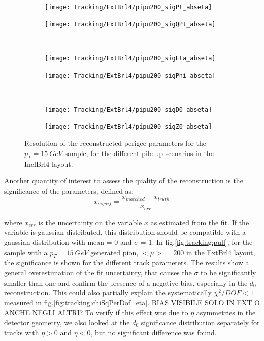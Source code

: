 \documentclass[a4paper,twoside,12pt]{article}
\begin{document}
\begin{figure}
\begin{subfigure}{.5\linewidth}
\texttt{[image: Tracking/ExtBrl4/pipu200\_sigPt\_abseta]}
\caption{}
\label{fig:tracking:pi15_sigPt_abseta_InclBrl4}
\end{subfigure}
\begin{subfigure}{.5\linewidth}
\texttt{[image: Tracking/ExtBrl4/pipu200\_sigQPt\_abseta]}
\caption{}
\label{fig:tracking:pi15_sigQPt_abseta_InclBrl4}
\end{subfigure}\\[1ex]
\begin{subfigure}{.5\linewidth}
\texttt{[image: Tracking/ExtBrl4/pipu200\_sigEta\_abseta]}
\caption{}
\label{fig:tracking:pi15_sigEta_abseta_InclBrl4}
\end{subfigure}
\begin{subfigure}{.5\linewidth}
\texttt{[image: Tracking/ExtBrl4/pipu200\_sigPhi\_abseta]}
\caption{}
\label{fig:tracking:pi15_sigPhi_abseta_InclBrl4}
\end{subfigure}\\[1ex]
\begin{subfigure}{.5\linewidth}
\texttt{[image: Tracking/ExtBrl4/pipu200\_sigD0\_abseta]}
\caption{}
\label{fig:tracking:pi15_sigD0_abseta_InclBrl4}
\end{subfigure}
\begin{subfigure}{.5\linewidth}
\texttt{[image: Tracking/ExtBrl4/pipu200\_sigZ0\_abseta]}
\caption{}
\label{fig:tracking:pi15_sigZ0_abseta_InclBrl4}
\end{subfigure}
\caption{Resolution of the reconstructed perigee parameters for the $p_{T} = 15\ GeV$ sample, for the different pile-up scenarios in the InclBrl4 layout.}
\label{fig:tracking:resolutionPileup_InclBrl4}
\end{figure}

Another quantity of interest to assess the quality of the reconstruction is the significance of the parameters, defined as:
$$
x_{signif} = \frac{x_{matched} - x_{truth}}{x_{err}}
$$

where $x_{err}$ is the uncertainty on the variable $x$ as estimated from the fit. If the variable is gaussian distributed, this distribution should be compatible with
a gaussian distribution with mean = 0 and $\sigma$ = 1. In fig.\ref{fig:tracking:pull}, for the sample with a $p_{T} = 15\ GeV$ generated pion, $<\mu> = 200$ in the ExtBrl4 layout, the significance is shown for the different
track parameters. The results show a general overestimation of the fit uncertainty, that causes the $\sigma$ to be significantly smaller than one and confirm the presence of 
a negative bias, especially in the $d_{0}$ reconstruction. This could also partially explain the systematically $\chi^2/DOF < 1$ measured in
fig.\ref{fig:tracking:chiSqPerDof_eta}. BIAS VISIBILE SOLO IN EXT O ANCHE NEGLI ALTRI? To verify if this effect was due to $\eta$ asymmetries in the detector geometry, 
we also looked at the $d_{0}$ significance distribution separately for tracks with $\eta > 0$ and $\eta < 0$, but no significant difference was found. \\
\end{document}
